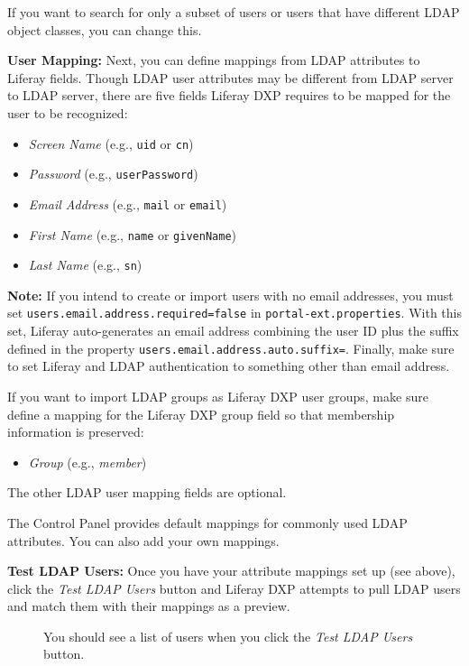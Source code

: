 If you want to search for only a subset of users or users that have
different LDAP object classes, you can change this.

\textbf{User Mapping:} Next, you can define mappings from LDAP
attributes to Liferay fields. Though LDAP user attributes may be
different from LDAP server to LDAP server, there are five fields Liferay
DXP requires to be mapped for the user to be recognized:

\begin{itemize}
\tightlist
\item
  \emph{Screen Name} (e.g., \texttt{uid} or \texttt{cn})
\item
  \emph{Password} (e.g., \texttt{userPassword})
\item
  \emph{Email Address} (e.g., \texttt{mail} or \texttt{email})
\item
  \emph{First Name} (e.g., \texttt{name} or \texttt{givenName})
\item
  \emph{Last Name} (e.g., \texttt{sn})
\end{itemize}

\textbf{Note:} If you intend to create or import users with no email
addresses, you must set \texttt{users.email.address.required=false} in
\texttt{portal-ext.properties}. With this set, Liferay auto-generates an
email address combining the user ID plus the suffix defined in the
property \texttt{users.email.address.auto.suffix=}. Finally, make sure
to set Liferay and LDAP authentication to something other than email
address.

If you want to import LDAP groups as Liferay DXP user groups, make sure
define a mapping for the Liferay DXP group field so that membership
information is preserved:

\begin{itemize}
\tightlist
\item
  \emph{Group} (e.g., \emph{member})
\end{itemize}

The other LDAP user mapping fields are optional.

The Control Panel provides default mappings for commonly used LDAP
attributes. You can also add your own mappings.

\textbf{Test LDAP Users:} Once you have your attribute mappings set up
(see above), click the \emph{Test LDAP Users} button and Liferay DXP
attempts to pull LDAP users and match them with their mappings as a
preview.

\begin{figure}
\centering
{}
\caption{You should see a list of users when you click the \emph{Test
LDAP Users} button.}
\end{figure}

